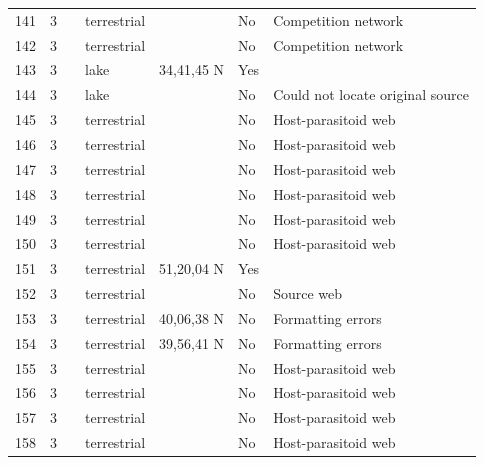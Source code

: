 \documentclass[12pt]{article}
\begin{document}
\begin{landscape}
\begin{table}[h!]
{\begin{tabular}{p{2.8cm}p{1.3cm}p{3cm}p{2.2cm}p{2.5cm}lp{8.2cm}}
        141   & 3 & \cite{Seifert1976}  & terrestrial &       & No    & Competition network \\
        142   & 3 & \cite{Seifert1976}  & terrestrial &       & No    & Competition network \\
        143   & 3 & \cite{Snow1958}    & lake  & 34,41,45 N & Yes   &       \\
        144   & 3 & \cite{Snow1958}  & lake  &       & No    & Could not locate original source \\
        145   & 3 & \cite{Rejmanek1979}  & terrestrial &       & No    & Host-parasitoid web \\
        146   & 3 & \cite{Rejmanek1979}  & terrestrial &       & No    & Host-parasitoid web \\
        147   & 3 & \cite{Rejmanek1979}  & terrestrial &       & No    & Host-parasitoid web \\
        148   & 3 & \cite{Rejmanek1979}  & terrestrial &       & No    & Host-parasitoid web \\
        149   & 3 & \cite{Force1974}    & terrestrial &       & No    & Host-parasitoid web \\
        150   & 3 & \cite{Hopkins1984}     & terrestrial &       & No    & Host-parasitoid web \\
        151   & 3 & \cite{Richards1926}     & terrestrial & 51,20,04 N & Yes   &       \\
        152   & 3 & \cite{Whittaker1984}    & terrestrial &       & No    & Source web \\
        153   & 3 & \cite{Mayse1978}    & terrestrial & 40,06,38 N & No  &  Formatting errors     \\
        154   & 3 & \cite{Mayse1978}    & terrestrial & 39,56,41 N & No  &  Formatting errors     \\
        155   & 3 & \cite{Askew1975}     & terrestrial &       & No    & Host-parasitoid web \\
        156   & 3 & \cite{Askew1961}     & terrestrial &       & No    & Host-parasitoid web \\
        157   & 3 & \cite{Askew1961}     & terrestrial &       & No    & Host-parasitoid web \\
        158   & 3 & \cite{Askew1961}     & terrestrial &       & No    & Host-parasitoid web \\
         \hline
      \end{tabular}}%
      \end{table}


\end{landscape}
\end{document}
